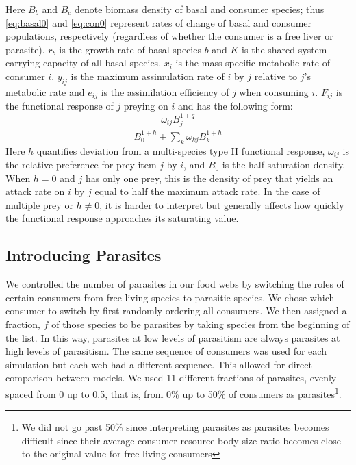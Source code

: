 \documentclass[11pt]{amsart}
\begin{document}
Here $B_b$ and $B_c$ denote biomass density of basal and consumer species; thus \eqref{eq:basal0} and \eqref{eq:con0} represent rates of change of basal and consumer populations, respectively (regardless of whether the consumer is a free liver or parasite).  $r_b$ is the growth rate of basal species $b$ and $K$ is the shared system carrying capacity of all basal species.  $x_i$ is the mass specific metabolic rate of consumer $i$. $y_{ij}$ is the maximum assimulation rate of $i$ by $j$ relative to $j$'s metabolic rate and $e_{ij}$ is the assimilation efficiency of $j$ when consuming $i$. $F_{ij}$ is the functional response of $j$ preying on $i$ and has the following form:
\begin{equation}
\frac{\omega_{ij}B_j^{1+q}}{B_0^{1+h} + \sum_k\omega_{kj}B_k^{1+h}}\label{eq:FR0}
\label{fr0}
\end{equation}
Here $h$ quantifies deviation from a multi-species type II functional response, $\omega_{ij}$ is the relative preference for prey item $j$ by $i$, and $B_0$ is the half-saturation density.  When $h=0$ and $j$ has only one prey, this is the density of prey that yields an attack rate on $i$ by $j$ equal to half the maximum attack rate.  In the case of multiple prey or $h\neq0$, it is harder to interpret but generally affects how quickly the functional response approaches its saturating value.  

\subsection{Introducing Parasites}

We controlled the number of parasites in our food webs by switching the roles of certain consumers from free-living species to parasitic species.  We chose which consumer to switch by first randomly ordering all consumers.  We then assigned a fraction, $f$ of those species to be parasites by taking species from the beginning of the list.  In this way, parasites at low levels of parasitism are always parasites at high levels of parasitism.  The same sequence of consumers was used for each simulation but each web had a different sequence.  This allowed for direct comparison between models.  We used 11 different fractions of parasites, evenly spaced from 0 up to 0.5, that is, from 0\% up to 50\% of consumers as parasites\footnote{We did not go past 50\% since interpreting parasites as parasites becomes difficult since their average consumer-resource body size ratio becomes close to the original value for free-living consumers}.
\end{document}
